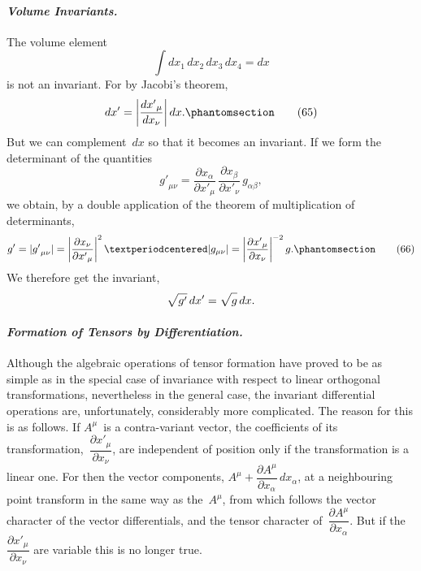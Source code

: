 \documentclass[12pt]{book}[2005/09/16]
\newcommand{\Paragraph}[1]{\paragraph*{\indent\normalfont\itshape#1}}
\newcommand{\Change}[2]{#2}
\newcommand{\Add}[1]{\Change{}{#1}}
\newcommand{\PageSep}[1]{\ignorespaces}
\newcommand{\Tag}[1]{%
  \phantomsection
  \label{eqn:#1}
  \tag*{#1}
}
\newcommand{\dd}{\partial}
\begin{document}
\Paragraph{Volume Invariants.} The volume element
\[
\int dx_{1}\, dx_{2}\, dx_{3}\, dx_{4} = dx
\]
is not an invariant. For by Jacobi's theorem,
\[
dx' = \left| \frac{{dx'}_{\mu}}{dx_{\nu}}\right| dx\Add{.}
\Tag{(65)}
\]
\PageSep{76}
But we can complement~$dx$ so that it becomes an invariant.
If we form the determinant of the quantities
\[
{g'}_{\mu\nu}
  = \frac{\dd x_{\alpha}}{{\dd x'}_{\mu}}\,
    \frac{\dd x_{\beta}}{{\dd x'}_{\nu}}\, g_{\alpha\beta}\Add{,}
\]
we obtain, by a double application of the theorem of
multiplication of determinants,
\[
g' = |{g'}_{\mu\nu}|
  = \left|\frac{\dd x_{\nu}}{{\dd x'}_{\mu}}\right|^{2}·|g_{\mu\nu}|
  = \left|\frac{{\dd x'}_{\mu}}{\dd x_{\nu}}\right|^{-2} g.
\Change{}{\Tag{(66)}}
\]
We therefore get the invariant,
\[
\sqrt{g'}\, dx' = \sqrt{g\vphantom{g'}}\, dx.
\]

\Paragraph{Formation of Tensors by Differentiation.} Although
%
%
the algebraic operations of tensor formation have proved
to be as simple as in the special case of invariance with
respect to linear orthogonal transformations, nevertheless
in the general case, the invariant differential operations
are, unfortunately, considerably more complicated. The
reason for this is as follows. If $A^{\mu}$~is a contra-variant
vector, the coefficients of its transformation,~$\dfrac{{\dd x'}_{\mu}}{\dd x_{\nu}}$, are independent
of position only if the transformation is a linear
one. For then the vector components, $A^{\mu} + \dfrac{\dd A^{\mu}}{\dd x_{\alpha}}\, dx_{\alpha}$, at
a neighbouring point transform in the same way as the~$A^{\mu}$,
from which follows the vector character of the vector
differentials, and the tensor character of~$\dfrac{\dd A^{\mu}}{\dd x_{\alpha}}$. But if the
$\dfrac{{\dd x'}_{\mu}}{\dd x_{\nu}}$ are variable this is no longer true.
\PageSep{77}
%
\end{document}
